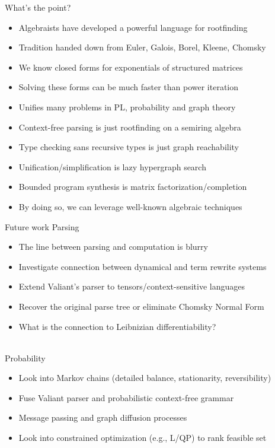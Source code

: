 \documentclass{beamer}
\begin{document}
    \begin{frame}{What's the point?}
        \begin{itemize}
            \item Algebraists have developed a powerful language for rootfinding
            \item Tradition handed down from Euler, Galois, Borel, Kleene, Chomsky
            \item We know closed forms for exponentials of structured matrices
            \item Solving these forms can be much faster than power iteration
            \item Unifies many problems in PL, probability and graph theory
            \item Context-free parsing is just rootfinding on a semiring algebra
            \item Type checking sans recursive types is just graph reachability
            \item Unification/simplification is lazy hypergraph search
            \item Bounded program synthesis is matrix factorization/completion
            \item By doing so, we can leverage well-known algebraic techniques
        \end{itemize}
    \end{frame}

    \begin{frame}{Future work}
        Parsing
        \begin{itemize}
            \item The line between parsing and computation is blurry
            \item Investigate connection between dynamical and term rewrite systems
            \item Extend Valiant's parser to tensors/context-sensitive languages
            \item Recover the original parse tree or eliminate Chomsky Normal Form
            \item What is the connection to Leibnizian differentiability?
        \end{itemize}
        \phantom{space}\\
        Probability
        \begin{itemize}
            \item Look into Markov chains (detailed balance, stationarity, reversibility)
        \item Fuse Valiant parser and probabilistic context-free grammar
        \item Message passing and graph diffusion processes
        \item Look into constrained optimization (e.g., L/QP) to rank feasible set
        \end{itemize}
    \end{frame}
\end{document}
